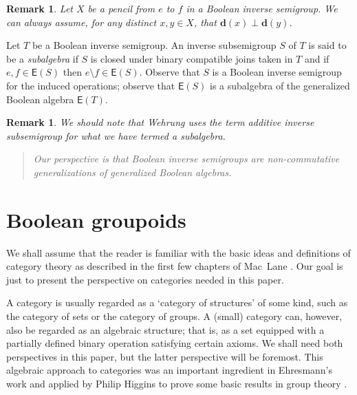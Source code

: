 \documentclass[a4paper]{amsart}
\newtheorem{remark}[theorem]{Remark}
\begin{document}
\begin{remark}
{\em Let $X$ be a pencil from $e$ to $f$ in a Boolean inverse semigroup.
We can always assume, for any distinct $x,y \in X$, 
that $\mathbf{d}(x) \perp \mathbf{d}(y)$.}
\end{remark}

Let $T$ be a Boolean inverse semigroup.
An inverse subsemigroup $S$ of $T$ is said to be a {\em subalgebra}
if $S$ is closed under binary compatible joins taken in $T$
and if $e,f \in \mathsf{E}(S)$ then $e \setminus f \in \mathsf{E}(S)$.
Observe that $S$ is a Boolean inverse semigroup for the induced operations;
observe that $\mathsf{E}(S)$ is a subalgebra of the generalized Boolean algebra $\mathsf{E}(T)$.

\begin{remark}{\em We should note that Wehrung \cite[Definition 3.1.17]{W} uses the term
{\em additive inverse subsemigroup} for what we have termed a subalgebra.}
\end{remark}



\begin{quote}
{\em Our perspective is that Boolean inverse semigroups are non-commutative generalizations of generalized Boolean algebras.}
\end{quote}


\section{Boolean groupoids}

We shall assume that the reader is familiar with the basic ideas and definitions of category theory
as described in the first few chapters of Mac~Lane \cite{Maclane}.
Our goal is just to present the perspective on categories needed in this paper.

A category is usually regarded as a `category of structures' of some kind, such as the category of sets or the category of groups.
A (small) category can, however, also be regarded as an algebraic structure; that is, as a set equipped with a partially defined binary operation satisfying certain axioms.
We shall need both perspectives in this paper, but the latter perspective will be foremost.
This algebraic approach to categories was an important ingredient in Ehresmann's work \cite{E} and applied by Philip Higgins to prove some basic results in group theory \cite{Higgins}.
\end{document}
